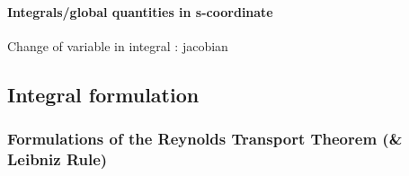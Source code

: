 \paragraph{Integrals/global quantities in s-coordinate}

Change of variable in integral : jacobian

\subsection{Integral formulation}

\subsubsection{Formulations of the Reynolds Transport Theorem (\& Leibniz Rule)}
